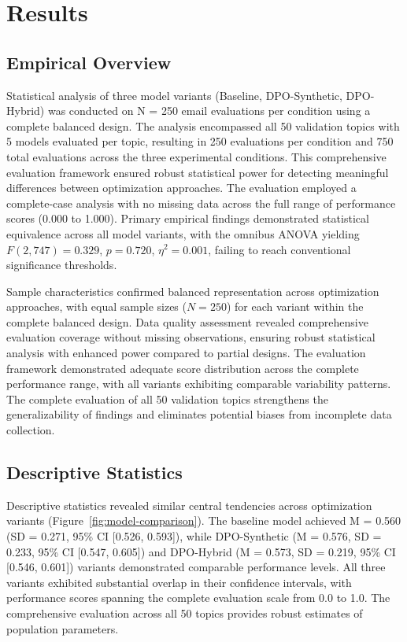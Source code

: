 \chapter{Results}
\label{sec:results}

\section{Empirical Overview}
\label{sec:empirical-overview}

Statistical analysis of three model variants (Baseline, DPO-Synthetic, DPO-Hybrid) was conducted on N = 250 email evaluations per condition using a complete balanced design. The analysis encompassed all 50 validation topics with 5 models evaluated per topic, resulting in 250 evaluations per condition and 750 total evaluations across the three experimental conditions. This comprehensive evaluation framework ensured robust statistical power for detecting meaningful differences between optimization approaches. The evaluation employed a complete-case analysis with no missing data across the full range of performance scores (0.000 to 1.000). Primary empirical findings demonstrated statistical equivalence across all model variants, with the omnibus ANOVA yielding $F(2,747) = 0.329$, $p = 0.720$, $\eta^2 = 0.001$, failing to reach conventional significance thresholds.

Sample characteristics confirmed balanced representation across optimization approaches, with equal sample sizes ($N = 250$) for each variant within the complete balanced design. Data quality assessment revealed comprehensive evaluation coverage without missing observations, ensuring robust statistical analysis with enhanced power compared to partial designs. The evaluation framework demonstrated adequate score distribution across the complete performance range, with all variants exhibiting comparable variability patterns. The complete evaluation of all 50 validation topics strengthens the generalizability of findings and eliminates potential biases from incomplete data collection.

\section{Descriptive Statistics}
\label{sec:descriptive-statistics}

Descriptive statistics revealed similar central tendencies across optimization variants (Figure~\ref{fig:model-comparison}). The baseline model achieved M = 0.560 (SD = 0.271, 95\% CI [0.526, 0.593]), while DPO-Synthetic (M = 0.576, SD = 0.233, 95\% CI [0.547, 0.605]) and DPO-Hybrid (M = 0.573, SD = 0.219, 95\% CI [0.546, 0.601]) variants demonstrated comparable performance levels. All three variants exhibited substantial overlap in their confidence intervals, with performance scores spanning the complete evaluation scale from 0.0 to 1.0. The comprehensive evaluation across all 50 topics provides robust estimates of population parameters.

